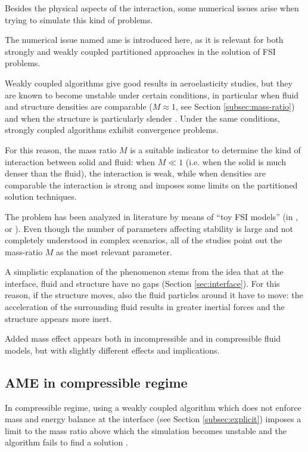 Besides the physical aspects of the interaction, some numerical issues arise when trying to simulate this kind of problems.

The numerical issue named \acrfull{ame} is introduced here, as it is relevant for both strongly and weakly coupled partitioned approaches in the solution of FSI problems. 

Weakly coupled algorithms give good results in aeroelasticity studies, but they are known to become unstable under certain conditions, in particular when fluid and structure densities are comparable ($M \approx 1$, see Section \ref{subsec:mass-ratio}) and when the structure is particularly slender \cite{causin2005added}.
Under the same conditions, strongly coupled algorithms exhibit convergence problems.

For this reason, the mass ratio $M$ is a suitable indicator to determine the kind of interaction between solid and fluid: when $M \ll 1$ (i.e. when the solid is much denser than the fluid), the interaction is weak, while when densities are comparable the interaction is strong and imposes some limits on the partitioned solution techniques.

The problem has been analyzed in literature by means of ``toy FSI models'' (in \cite{causin2005added}, \cite{degroote2008stability} or \cite{mehl2016parallel}). Even though the number of parameters affecting stability is large and not completely understood in complex scenarios, all of the studies point out the mass-ratio $M$ as the most relevant parameter.

A simplistic explanation of the phenomenon stems from the idea that at the interface, fluid and structure have no gaps (Section \ref{sec:interface}). For this reason, if the structure moves, also the fluid particles around it have to move: the acceleration of the surrounding fluid results in greater inertial forces and the structure appears more inert. 

Added mass effect appears both in incompressible and in compressible fluid models, but with slightly different effects and implications.


\subsection{AME in compressible regime}  

In compressible regime, using a weakly coupled algorithm which does not enforce mass and energy balance at the interface (see Section \ref{subsec:explicit}) imposes a limit to the mass ratio above which the simulation becomes unstable and the algorithm fails to find a solution \cite{bodnar2014fluid}.

